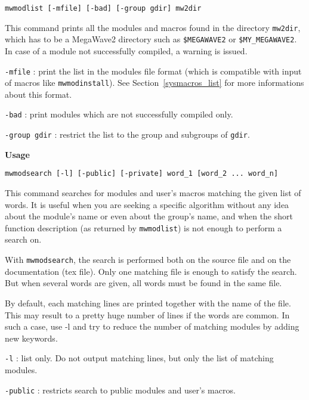 \verb+mwmodlist [-mfile] [-bad] [-group gdir] mw2dir+

\Next

\Description
This command prints all the modules and macros found in the directory \verb+mw2dir+, 
which has to be a MegaWave2 directory such as \verb+$MEGAWAVE2+ or \verb+$MY_MEGAWAVE2+.
In case of a module not successfully compiled, a warning is issued.
\Next

\Options

\verb+-mfile+ : print the list in the modules file format (which is compatible with 
input of macros like \verb+mwmodinstall+). See Section~\ref{sysmacros_list} for more 
informations about this format.

\verb+-bad+ : print modules which are not successfully compiled only.

\verb+-group gdir+ : restrict the list to the group and subgroups of \verb+gdir+.

\newpage

{\Large\bf Usage} \bigskip

\verb+mwmodsearch [-l] [-public] [-private] word_1 [word_2 ... word_n]+

\Next

\Description
This command searches for modules and user's macros matching the given list of words. It is useful when you are
seeking a specific algorithm without any idea about the module's name or even about the group's name, and
when the short function description (as returned by {\tt mwmodlist}) is not enough to perform a search on.

With {\tt mwmodsearch}, the search is performed both on the source file and on the documentation (tex file). 
Only one matching file is enough to satisfy the search. 
But when several words are given, all words must be found in the same file.

By default, each matching lines are printed together with the name of the file. This may result to a pretty
huge number of lines if the words are common. In such a case, use -l and try to reduce the number of matching
modules by adding new keywords.

\Next

\Options

\verb+-l+ : list only. Do not output matching lines, but only the list of matching modules.

\verb+-public+ : restricts search to public modules and user's macros.

